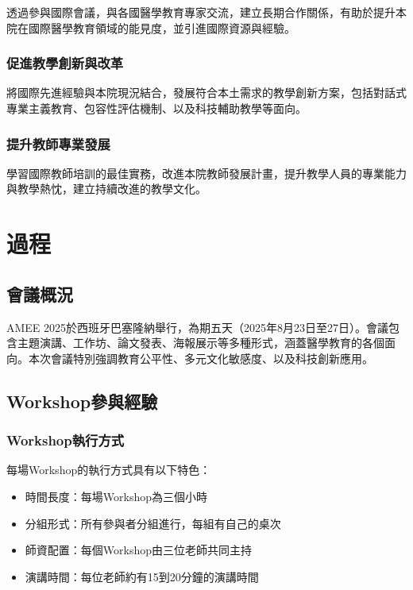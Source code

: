 \documentclass[12pt,a4paper]{article}
\begin{document}
透過參與國際會議，與各國醫學教育專家交流，建立長期合作關係，有助於提升本院在國際醫學教育領域的能見度，並引進國際資源與經驗。

\subsubsection{促進教學創新與改革}

將國際先進經驗與本院現況結合，發展符合本土需求的教學創新方案，包括對話式專業主義教育、包容性評估機制、以及科技輔助教學等面向。

\subsubsection{提升教師專業發展}

學習國際教師培訓的最佳實務，改進本院教師發展計畫，提升教學人員的專業能力與教學熱忱，建立持續改進的教學文化。

\section{過程}

\subsection{會議概況}

AMEE 2025於西班牙巴塞隆納舉行，為期五天（2025年8月23日至27日）。會議包含主題演講、工作坊、論文發表、海報展示等多種形式，涵蓋醫學教育的各個面向。本次會議特別強調教育公平性、多元文化敏感度、以及科技創新應用。

\subsection{Workshop參與經驗}

\subsubsection{Workshop執行方式}

每場Workshop的執行方式具有以下特色：

\begin{itemize}[nosep]
    \item 時間長度：每場Workshop為三個小時
    \item 分組形式：所有參與者分組進行，每組有自己的桌次
    \item 師資配置：每個Workshop由三位老師共同主持
    \item 演講時間：每位老師約有15到20分鐘的演講時間
\end{itemize}
\end{document}
